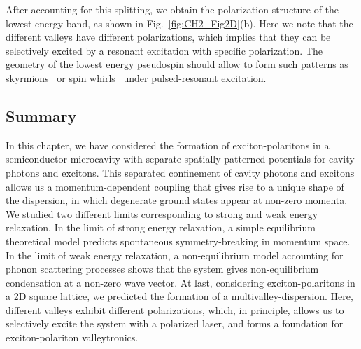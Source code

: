 After accounting for this splitting, we obtain the polarization structure of the lowest energy band, as shown in Fig.~\ref{fig:CH2_Fig2D}(b).
Here we note that the different valleys have different polarizations, which implies that they can be selectively excited by a resonant excitation with specific polarization.
The geometry of the lowest energy pseudospin should allow to form such patterns as skyrmions~\cite{Flayac:2013aa,Cilibrizzi:2016aa} or spin whirls~\cite{Cilibrizzi:2015aa} under pulsed-resonant excitation.

%
%
\subsection{Summary}
In this chapter, we have considered the formation of exciton-polaritons in a semiconductor microcavity with separate spatially patterned potentials for cavity photons and excitons.
This separated confinement of cavity photons and excitons allows us a momentum-dependent coupling that gives rise to a unique shape of the dispersion, in which degenerate ground states appear at non-zero momenta.
We studied two different limits corresponding to strong and weak energy relaxation.
In the limit of strong energy relaxation, a simple equilibrium theoretical model predicts spontaneous symmetry-breaking in momentum space.
In the limit of weak energy relaxation, a non-equilibrium model accounting for phonon scattering processes shows that the system gives non-equilibrium condensation at a non-zero wave vector.
At last, considering exciton-polaritons in a 2D square lattice, we predicted the formation of a multivalley-dispersion.
Here, different valleys exhibit different polarizations, which, in principle, allows us to selectively excite the system with a polarized laser, and forms a foundation for exciton-polariton valleytronics.


